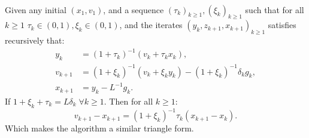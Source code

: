 \documentclass[12pt]{article}
\begin{document}
    \begin{proposition}\label{prop:abs-st-form}\;\\
        Given any initial $(x_1, v_1)$, and a sequence $(\tau_k)_{k \ge 1}, (\xi_k)_{k \ge 1}$ such that for all $k \ge 1$ $\tau_k \in (0, 1), \xi_k \in (0, 1)$, and the iterates $(y_k, z_{k + 1}, x_{k + 1})_{k \ge 1}$ satisfies recursively that: 
        \begin{align*}
            y_k &= (1 + \tau_k)^{-1}(v_k + \tau_k x_k),
            \\
            v_{k + 1} &= (1 + \xi_k)^{-1}(v_k + \xi_k y_k) - (1 + \xi_k)^{-1}\delta_k g_k,
            \\
            x_{k + 1} &= y_k - L^{-1} g_k. 
        \end{align*}
        If $1 + \xi_k + \tau_k = L\delta_k\; \forall k \ge 1$. 
        Then for all $k \ge 1$: 
        $$
            v_{k + 1} - x_{k + 1} = (1 + \xi_k)^{-1}\tau_k(x_{k + 1} - x_k). 
        $$
        Which makes the algorithm a similar triangle form. 
    \end{proposition}
\end{document}
